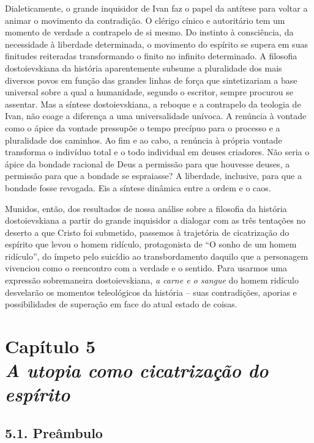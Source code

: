 Dialeticamente, o grande inquisidor de Ivan faz o papel da antítese para
voltar a animar o movimento da contradição. O clérigo cínico e
autoritário tem um momento de verdade a contrapelo de si mesmo. Do
instinto à consciência, da necessidade à liberdade determinada, o
movimento do espírito se supera em suas finitudes reiteradas
transformando o finito no infinito determinado. A filosofia
dostoievskiana da história aparentemente subsume a pluralidade dos mais
diversos povos em função das grandes linhas de força que sintetizariam a
base universal sobre a qual a humanidade, segundo o escritor, sempre
procurou se assentar. Mas a síntese dostoievskiana, a reboque e a
contrapelo da teologia de Ivan, não coage a diferença a uma
universalidade unívoca. A renúncia à vontade como o ápice da vontade
pressupõe o tempo precípuo para o processo e a pluralidade dos caminhos.
Ao fim e ao cabo, a renúncia à própria vontade transforma o indivíduo
total e o todo individual em deuses criadores. Não seria o ápice da
bondade racional de Deus a permissão para que houvesse deuses, a
permissão para que a bondade se espraiasse? A liberdade, inclusive, para
que a bondade fosse revogada. Eis a síntese dinâmica entre a ordem e o
caos.

Munidos, então, dos resultados de nossa análise sobre a filosofia da
história dostoievskiana a partir do grande inquisidor a dialogar com as
três tentações no deserto a que Cristo foi submetido, passemos à
trajetória de cicatrização do espírito que levou o homem ridículo,
protagonista de ``O sonho de um homem ridículo'', do ímpeto pelo
suicídio ao transbordamento daquilo que a personagem vivenciou como o
reencontro com a verdade e o sentido. Para usarmos uma expressão
sobremaneira dostoievskiana, \emph{a carne e o sangue} do homem ridículo
desvelarão os momentos teleológicos da história -- suas contradições,
aporias e possibilidades de superação em face do atual estado de coisas.

\chapter*{Capítulo 5\\
\bigskip
\emph{A utopia como cicatrização do espírito}}


\section{5.1. Preâmbulo}

